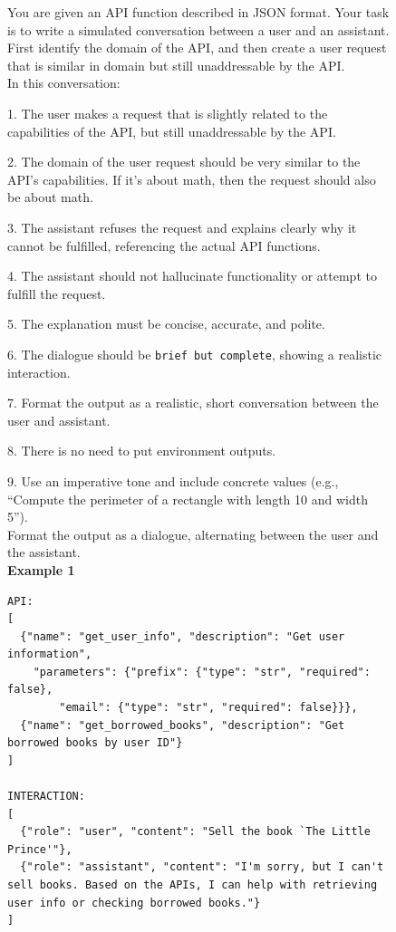 \documentclass[table]{ai2style/ai2}
\begin{document}
{{\begin{figure}[h!]
\begin{prompt}{}\footnotesize

You are given an API function described in JSON format. Your task is to write a simulated conversation between a user and an assistant.
First identify the domain of the API, and then create a user request that is similar in domain but still unaddressable by the API. \\

In this conversation:

1. The user makes a request that is slightly related to the capabilities of the API, but still unaddressable by the API.

2. The domain of the user request should be very similar to the API's capabilities. If it's about math, then the request should also be about math.

3. The assistant refuses the request and explains clearly why it cannot be fulfilled, referencing the actual API functions.

4. The assistant should not hallucinate functionality or attempt to fulfill the request.

5. The explanation must be concise, accurate, and polite.

6. The dialogue should be \texttt{brief but complete}, showing a realistic interaction.

7. Format the output as a realistic, short conversation between the user and assistant.

8. There is no need to put environment outputs.

9. Use an imperative tone and include concrete values (e.g., ``Compute the perimeter of a rectangle with length 10 and width 5''). \\

Format the output as a dialogue, alternating between the user and the assistant. \\

{\bf Example 1}

\begin{lstlisting}[basicstyle=\ttfamily\footnotesize,breaklines=true]
API:
[
  {"name": "get_user_info", "description": "Get user information",
    "parameters": {"prefix": {"type": "str", "required": false},
        "email": {"type": "str", "required": false}}},
  {"name": "get_borrowed_books", "description": "Get borrowed books by user ID"}
]

INTERACTION:
[
  {"role": "user", "content": "Sell the book `The Little Prince'"},
  {"role": "assistant", "content": "I'm sorry, but I can't sell books. Based on the APIs, I can help with retrieving user info or checking borrowed books."}
]
\end{lstlisting}


\end{prompt}
\end{figure}}}
\end{document}
